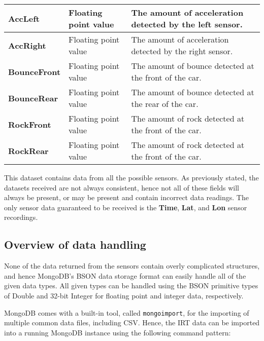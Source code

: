 \documentclass[a4paper,11pt]{article}
\begin{document}
\begin{table}[h]
{\begin{tabular}{ | l | l | l | }
\textbf{AccLeft}        & Floating point value                   & The amount of acceleration detected by the left sensor.  \\ \hline
\textbf{AccRight}       & Floating point value                   & The amount of acceleration detected by the right sensor.  \\ \hline
\textbf{BounceFront}    & Floating point value                   & The amount of bounce detected at the front of the car.  \\ \hline
\textbf{BounceRear}     & Floating point value                   & The amount of bounce detected at the rear of the car.  \\ \hline
\textbf{RockFront}      & Floating point value                   & The amount of rock detected at the front of the car.  \\ \hline
\textbf{RockRear}       & Floating point value                   & The amount of rock detected at the front of the car.  \\ \hline

\end{tabular}}
\end{table}

This dataset contains data from all the possible sensors. As previously stated, the datasets received are not always
consistent, hence not all of these fields will always be present, or may be present and contain incorrect data readings.
The only sensor data guaranteed to be received is the \textbf{Time}, \textbf{Lat}, and \textbf{Lon} sensor recordings.



\subsection{Overview of data handling} %
\label{sub:overview_of_data_handling}

None of the data returned from the sensors contain overly complicated structures, and hence MongoDB's BSON data storage
format can easily handle all of the given data types. All given types can be handled using the BSON primitive types of
Double and 32-bit Integer for floating point and integer data, respectively.

MongoDB comes with a built-in tool, called \texttt{mongoimport}, for the importing of multiple common data files, including
CSV. Hence, the IRT data can be imported into a running MongoDB instance using the following command pattern:
\end{document}
